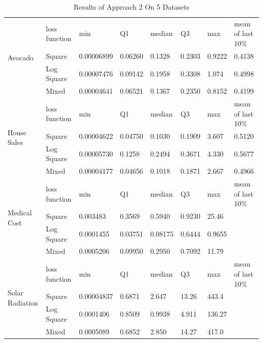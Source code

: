 \documentclass[runningheads]{llncs}
\begin{document}
\begin{table}[h]
\begin{center}
\begin{tabular}{|l|l|l|l|l|l|l|l|}
\hline
\multirow{4}{*}{Avocado}         & loss function & min        & Q1      & median & Q3     & max    & mean of last 10\% \\ \cline{2-8} 
                                 & Square        & 0.00006899 & 0.06260 & 0.1328 & 0.2303 & 0.9222 & 0.4138            \\ \cline{2-8} 
                                 & Log Square    & 0.00007476 & 0.09142 & 0.1958 & 0.3308 & 1.074  & 0.4998            \\ \cline{2-8} 
                                 & Mixed         & 0.00004641 & 0.06521 & 0.1367 & 0.2350 & 0.8152 & 0.4199            \\ \hline
\multirow{4}{*}{House Sales}     & loss function & min        & Q1      & median & Q3     & max    & mean of last 10\% \\ \cline{2-8} 
                                 & Square        & 0.00004622 & 0.04750 & 0.1030 & 0.1909 & 3.607 & 0.5120            \\ \cline{2-8} 
                                 & Log Square    & 0.00005730 & 0.1258 & 0.2494 & 0.3671 & 4.330 & 0.5677            \\ \cline{2-8} 
                                 & Mixed         & 0.00004177 & 0.04656 & 0.1018 & 0.1871 & 2.667 & 0.4966            \\ \hline
\multirow{4}{*}{Medical Cost}    & loss function & min        & Q1      & median & Q3     & max    & mean of last 10\% \\ \cline{2-8} 
                                 & Square        & 0.003483 & 0.3569 & 0.5940 & 0.9230 & 25.46        &                   \\ \cline{2-8} 
                                 & Log Square    & 0.0001455 & 0.03751 & 0.08175 & 0.6444 & 0.9655  &                   \\ \cline{2-8} 
                                 & Mixed         &  0.0005206 & 0.09950 & 0.2950 & 0.7092 & 11.79        &                   \\ \hline
\multirow{4}{*}{Solar Radiation} & loss function & min        & Q1      & median & Q3     & max    & mean of last 10\% \\ \cline{2-8} 
                                 & Square        & 0.00004837 & 0.6871 & 2.647 & 13.26 & 443.4 &                   \\ \cline{2-8} 
                                 & Log Square    & 0.0001406 & 0.8509 & 0.9938 & 4.911 & 136.27 &                   \\ \cline{2-8} 
                                 & Mixed         & 0.0005089 & 0.6852 & 2.850 & 14.27 & 417.0  &                   \\ \hline
\end{tabular}
\end{center}
\caption{Results of Approach 2 On 5 Datasets}
\end{table}
\end{document}
